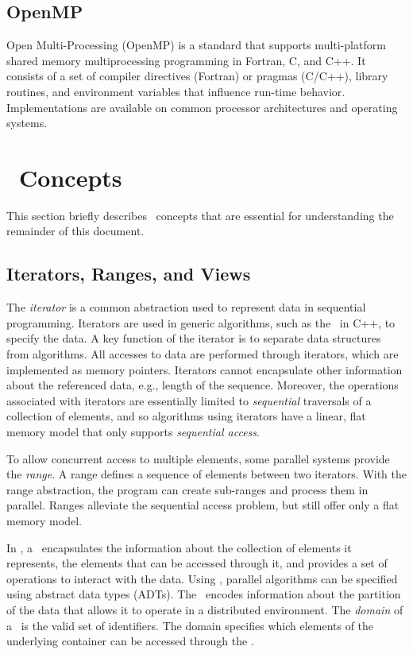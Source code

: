 \documentclass{report}
\begin{document}
\subsection{OpenMP}

Open Multi-Processing (OpenMP) is a standard that supports multi-platform shared memory multiprocessing programming in Fortran, C, and C++.
It consists of a set of compiler directives (Fortran) or pragmas (C/C++), library routines, and environment variables that influence run-time behavior.
Implementations are available on common processor architectures and operating systems.

\section{\stapl\ Concepts}

This section briefly describes \stapl\ concepts that are
essential for understanding the remainder of this document.

\subsection{Iterators, Ranges, and Views}

The \emph{iterator} is a common abstraction used to represent data
in sequential programming.
Iterators are used in generic algorithms, such as
the \stl\ in C++, to specify the data.
A key function of the iterator is to separate data structures from algorithms.
All accesses to data are performed through iterators, which are implemented
as memory pointers.  Iterators cannot encapsulate other information about the
referenced data, e.g., length of the sequence.
Moreover, the operations associated with iterators are essentially
limited to {\em sequential} traversals of a collection of elements,
and so algorithms using iterators have a linear, flat memory model
that only supports {\em sequential access}.

To allow concurrent access to multiple elements,
some parallel systems provide the \emph{range}.
A range defines a sequence of elements between two
iterators. With the range abstraction, the program can create
sub-ranges and process them in parallel.  Ranges alleviate the
sequential access problem, but still offer only a flat memory model.

In \stapl, a \pview\ encapsulates the information about the collection
of elements it represents, the elements that can be accessed through it,
and provides a set of operations to interact with the data.
Using \pviews, parallel algorithms can be specified using abstract data
types (ADTs).  The \pview\ encodes information about the partition of
the data that allows it to operate in a distributed environment.
The \emph{domain} of a \pview\ is the valid set of identifiers.
The domain specifies which elements of the underlying container
can be accessed through the \pview.
\end{document}
